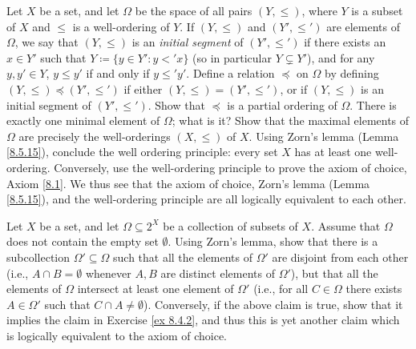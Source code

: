 \begin{exercise}\label{ex 8.5.19}
    Let \(X\) be a set, and let \(\Omega\) be the space of all pairs \((Y, \leq)\), where \(Y\) is a subset of \(X\) and \(\leq\) is a well-ordering of \(Y\).
    If \((Y, \leq)\) and \((Y', \leq')\) are elements of \(\Omega\), we say that \((Y, \leq)\) is an \emph{initial segment} of \((Y', \leq')\) if there exists an \(x \in Y'\) such that \(Y \coloneqq \{y \in Y' : y <' x\}\) (so in particular \(Y \subsetneq Y'\)), and for any \(y, y' \in Y\), \(y \leq y'\) if and only if \(y \leq' y'\).
    Define a relation \(\preceq\) on \(\Omega\) by defining \((Y, \leq) \preceq (Y', \leq')\) if either \((Y, \leq) = (Y', \leq')\), or if \((Y, \leq)\) is an initial segment of \((Y', \leq')\).
    Show that \(\preceq\) is a partial ordering of \(\Omega\).
    There is exactly one minimal element of \(\Omega\);
    what is it?
    Show that the maximal elements of \(\Omega\) are precisely the well-orderings \((X, \leq)\) of \(X\).
    Using Zorn's lemma (Lemma \ref{8.5.15}), conclude the well ordering principle:
    every set \(X\) has at least one well-ordering.
    Conversely, use the well-ordering principle to prove the axiom of choice, Axiom \ref{8.1}.
    We thus see that the axiom of choice, Zorn's lemma (Lemma \ref{8.5.15}), and the well-ordering principle are all logically equivalent to each other.
\end{exercise}

\begin{exercise}\label{ex 8.5.20}
    Let \(X\) be a set, and let \(\Omega \subseteq 2^X\) be a collection of subsets of \(X\).
    Assume that \(\Omega\) does not contain the empty set \(\emptyset\).
    Using Zorn's lemma, show that there is a subcollection \(\Omega' \subseteq \Omega\) such that all the elements of \(\Omega'\) are disjoint from each other (i.e., \(A \cap B = \emptyset\) whenever \(A, B\) are distinct elements of \(\Omega'\)), but that all the elements of \(\Omega\) intersect at least one element of \(\Omega'\) (i.e., for all \(C \in \Omega\) there exists \(A \in \Omega'\) such that \(C \cap A \neq \emptyset\)).
    Conversely, if the above claim is true, show that it implies the claim in Exercise \ref{ex 8.4.2}, and thus this is yet another claim which is logically equivalent to the axiom of choice.
\end{exercise}